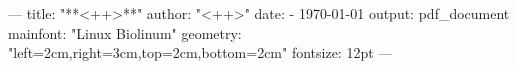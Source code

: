 ---
title: "**<++>**"
author: "<++>"
date:
- \today
output:
  pdf_document
mainfont: "Linux Biolinum"
geometry: "left=2cm,right=3cm,top=2cm,bottom=2cm"
fontsize: 12pt
---
